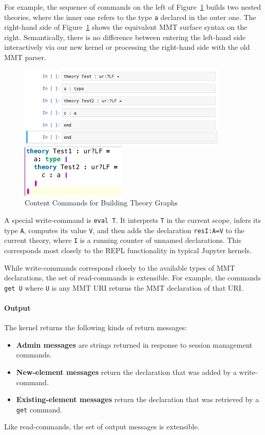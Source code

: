 For example, the sequence of commands on the left of Figure~\ref{fig:test_theory} builds two nested theories, where the inner one refers to the type \texttt{a} declared in the outer one.
The right-hand side of Figure~\ref{fig:test_theory} shows the equivalent MMT surface syntax on the right.
Semantically, there is no difference between entering the left-hand side interactively via our new kernel or processing the right-hand side with the old MMT parser.
\begin{figure}[ht]\centering
\begin{minipage}[c]{10cm}\includegraphics[width=10cm]{test_theory_jupyter}\end{minipage}
\begin{minipage}[c]{5cm}\includegraphics[width=5cm]{test_theory}\end{minipage}
\caption{Content Commands for Building Theory Graphs}\label{fig:test_theory}
\end{figure}

A special write-command is \texttt{eval T}.
It interprets \texttt{T} in the current scope, infers its type \texttt{A}, computes its value \texttt{V}, and then adds the declaration \texttt{resI:A=V} to the current theory, where \texttt{I} is a running counter of unnamed declarations.
This corresponds most closely to the REPL functionality in typical Jupyter kernels.

While write-commands correspond closely to the available types of MMT declarations, the set of read-commands is extensible.
For example, the commands \texttt{get U} where \texttt{U} is any MMT URI returns the MMT declaration of that URI.

\paragraph{Output}
The kernel returns the following kinds of return messages:
\begin{itemize}
\item \textbf{Admin messages} are strings returned in response to session management commands.
\item \textbf{New-element messages} return the declaration that was added by a write-command.
\item \textbf{Existing-element messages} return the declaration that was retrieved by a \texttt{get} command.
\end{itemize}
Like read-commands, the set of output messages is extensible.

